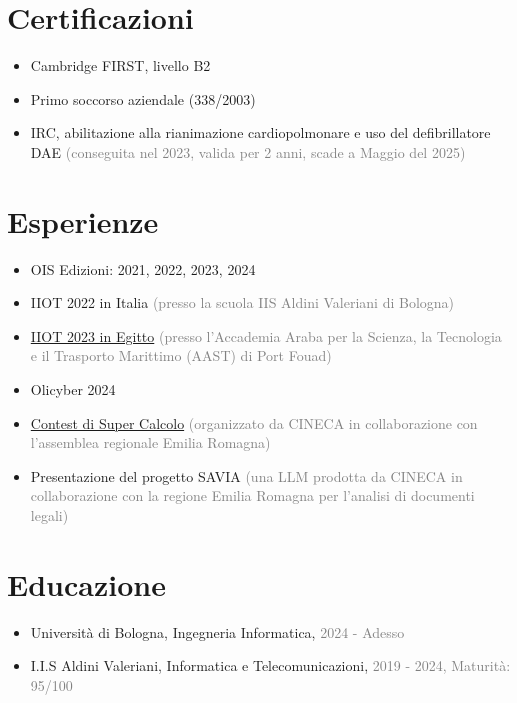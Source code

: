 \documentclass{paper}
\begin{document}
\section{Certificazioni}

\begin{itemize}
    \item Cambridge FIRST, livello B2
    \item Primo soccorso aziendale (338/2003)
    \item IRC, abilitazione alla rianimazione cardiopolmonare e uso del defibrillatore DAE \textcolor{gray}{(conseguita nel 2023, valida per 2 anni, scade a Maggio del 2025)}
\end{itemize}

\section{Esperienze}

\begin{itemize}
    \item OIS Edizioni: 2021, 2022, 2023, 2024
    \item IIOT 2022 in Italia \textcolor{gray}{(presso la scuola IIS Aldini Valeriani di Bologna)}
    \item \href{https://forum.olinfo.it/t/iiot-2023-diary/8278}{IIOT 2023 in Egitto} \textcolor{gray}{(presso l'Accademia Araba per la Scienza, la Tecnologia e il Trasporto Marittimo (AAST) di Port Fouad)}
    \item Olicyber 2024
    \item \href{https://www.ilrestodelcarlino.it/bologna/cronaca/sfida-tra-studenti-sul-supercalcolo-vincono-le-scuole-aldini-valeriani-8638a766}{Contest di Super Calcolo} \textcolor{gray}{(organizzato da CINECA in collaborazione con l'assemblea regionale Emilia Romagna)}
    \item Presentazione del progetto SAVIA \textcolor{gray}{(una LLM prodotta da CINECA in collaborazione con la regione Emilia Romagna per l'analisi di documenti legali)}
\end{itemize}

\section{Educazione}

\begin{itemize}
    \item Università di Bologna, Ingegneria Informatica, \textcolor{gray}{2024 - Adesso}
    \item I.I.S Aldini Valeriani, Informatica e Telecomunicazioni, \textcolor{gray}{2019 - 2024, Maturità: 95/100}
\end{itemize}
\end{document}
